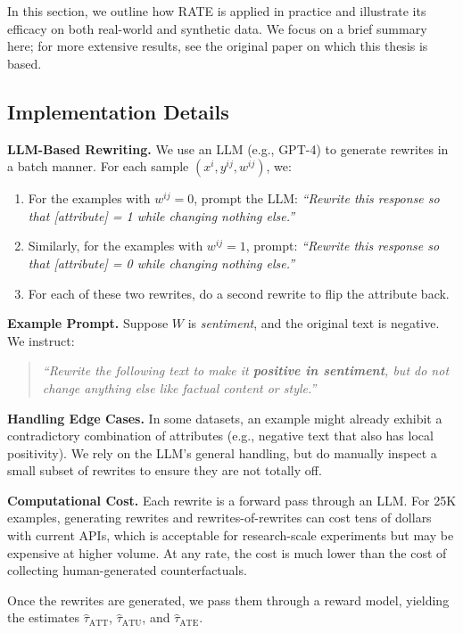 In this section, we outline how RATE is applied in practice and illustrate its efficacy on both real-world and synthetic data. We focus on a brief summary here; for more extensive results, see the original paper on which this thesis is based.

\subsection{Implementation Details}

\textbf{LLM-Based Rewriting.} We use an LLM (e.g., GPT-4) to generate rewrites in a batch manner. For each sample $(x^i, y^{ij}, w^{ij})$, we:
\begin{enumerate}
    \item For the examples with $w^{ij} = 0$, prompt the LLM: \emph{``Rewrite this response so that [attribute] = 1 while changing nothing else.''}
    \item Similarly, for the examples with $w^{ij} = 1$, prompt: \emph{``Rewrite this response so that [attribute] = 0 while changing nothing else.''}
    \item For each of these two rewrites, do a second rewrite to flip the attribute back.
\end{enumerate}

\textbf{Example Prompt.} Suppose $W$ is \emph{sentiment}, and the original text is negative. We instruct:
\begin{quote}
\textit{``Rewrite the following text to make it \textbf{positive in sentiment}, but do not change anything else like factual content or style.''}
\end{quote}

\textbf{Handling Edge Cases.} In some datasets, an example might already exhibit a contradictory combination of attributes (e.g., negative text that also has local positivity). We rely on the LLM’s general handling, but do manually inspect a small subset of rewrites to ensure they are not totally off.

\textbf{Computational Cost.} Each rewrite is a forward pass through an LLM. For 25K examples, generating rewrites and rewrites-of-rewrites can cost tens of dollars with current APIs, which is acceptable for research-scale experiments but may be expensive at higher volume. At any rate, the cost is much lower than the cost of collecting human-generated counterfactuals.

Once the rewrites are generated, we pass them through a reward model, yielding the estimates $\hat{\tau}_{\text{ATT}}$, $\hat{\tau}_{\text{ATU}}$, and $\hat{\tau}_{\text{ATE}}$.

